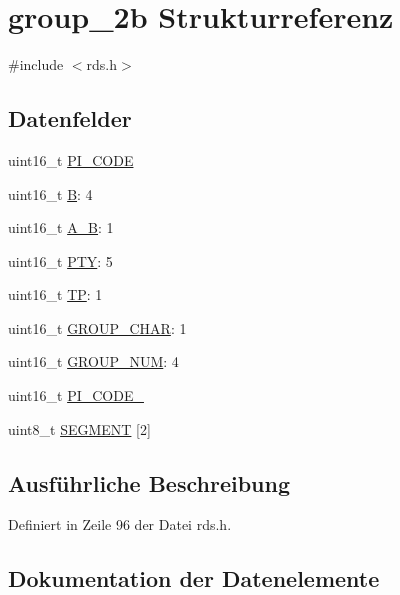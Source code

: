\hypertarget{structgroup__2b}{}\section{group\+\_\+2b Strukturreferenz}
\label{structgroup__2b}


{\ttfamily \#include $<$rds.\+h$>$}

\subsection*{Datenfelder}
\begin{DoxyCompactItemize}
\item 
uint16\+\_\+t \hyperlink{structgroup__2b_a5cd9b1f6413028425796c1129aa8fd87}{P\+I\+\_\+\+C\+O\+D\+E}
\item 
uint16\+\_\+t \hyperlink{structgroup__2b_ae783bd90764c8455228772c025c064e4}{B}\+: 4
\item 
uint16\+\_\+t \hyperlink{structgroup__2b_a226eb9a4ec1152d0c92ce7324916ad56}{A\+\_\+\+B}\+: 1
\item 
uint16\+\_\+t \hyperlink{structgroup__2b_a0474967478fbbc2c71b800d2e0132d45}{P\+T\+Y}\+: 5
\item 
uint16\+\_\+t \hyperlink{structgroup__2b_ab9e634c63b0d95a96716d5f6d7f06d72}{T\+P}\+: 1
\item 
uint16\+\_\+t \hyperlink{structgroup__2b_a66d4119990dc4c3e040a43885e9bb953}{G\+R\+O\+U\+P\+\_\+\+C\+H\+A\+R}\+: 1
\item 
uint16\+\_\+t \hyperlink{structgroup__2b_a9f692e9f76ee88348d426bcd4e9bc70b}{G\+R\+O\+U\+P\+\_\+\+N\+U\+M}\+: 4
\item 
uint16\+\_\+t \hyperlink{structgroup__2b_ae86fed9d07832a5c3cc36d5aaa064bcb}{P\+I\+\_\+\+C\+O\+D\+E\+\_}
\item 
uint8\+\_\+t \hyperlink{structgroup__2b_ad4b043906241d98e6b480a31f1438352}{S\+E\+G\+M\+E\+N\+T} \mbox{[}2\mbox{]}
\end{DoxyCompactItemize}


\subsection{Ausführliche Beschreibung}


Definiert in Zeile 96 der Datei rds.\+h.



\subsection{Dokumentation der Datenelemente}
\hypertarget{structgroup__2b_a226eb9a4ec1152d0c92ce7324916ad56}{}
